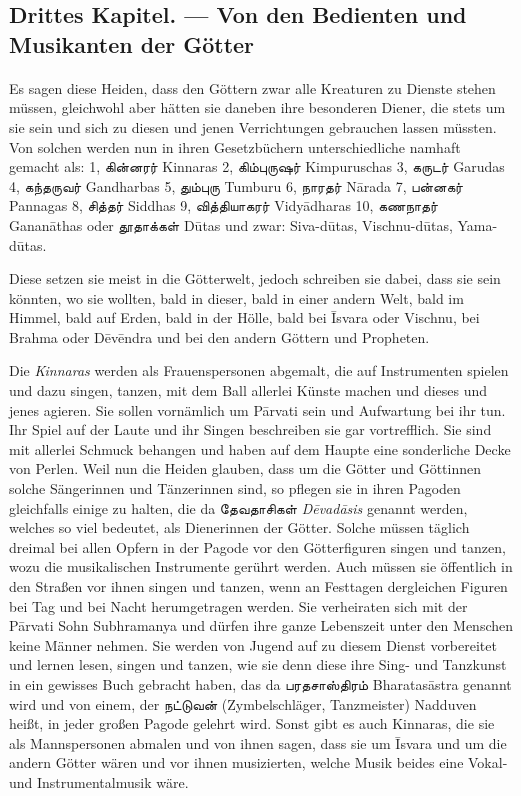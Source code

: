 \documentclass{article}
\newcommand{\TamilText}[1]{\texttamil{#1}}
\newcommand{\tam}[1]{\TamilText{#1}}
\begin{document}
\subsection{Drittes Kapitel. — Von den Bedienten und Musikanten der Götter}
\paragraph{}
Es sagen diese Heiden, dass den Göttern zwar alle Kreaturen zu Dienste stehen müssen, gleichwohl aber hätten sie daneben ihre besonderen Diener, die stets um sie sein und sich zu diesen und jenen Verrichtungen gebrauchen lassen müssten. Von solchen werden nun in ihren Gesetzbüchern unterschiedliche namhaft gemacht als: 1, \tam{கின்னரர்} Kinnaras 2, \tam{கிம்புருஷர்} Kimpuruschas 3, \tam{கருடர்} Garudas 4, \tam{கந்தருவர்} Gandharbas 5, \tam{தும்புரு} Tumburu 6, \tam{நாரதர்} N\={a}rada 7, \tam{பன்னகர்} Pannagas 8, \tam{சித்தர்} Siddhas 9, \tam{வித்தியாகரர்} Vidy\={a}dharas 10, \tam{கணநாதர்} Ganan\={a}thas oder \tam{தூதாக்கள்} D\={u}tas und zwar: Siva-d\={u}tas, Vischnu-d\={u}tas, Yama-d\={u}tas.

Diese setzen sie meist in die Götterwelt, jedoch schreiben sie dabei, dass sie sein könnten, wo sie wollten, bald in dieser, bald in einer andern Welt, bald im Himmel, bald auf Erden, bald in der Hölle, bald bei \={I}svara oder Vischnu, bei Brahma oder D\={e}v\={e}ndra und bei den andern Göttern und Propheten.

Die \emph{Kinnaras} werden als Frauenspersonen abgemalt, die auf Instrumenten spielen und dazu singen, tanzen, mit dem Ball allerlei Künste machen und dieses und jenes agieren. Sie sollen vornämlich um P\={a}rvati sein und Aufwartung bei ihr tun. Ihr Spiel auf der Laute und ihr Singen beschreiben sie gar vortrefflich. Sie sind mit allerlei Schmuck behangen und haben auf dem Haupte eine sonderliche Decke von Perlen. Weil nun die Heiden glauben, dass um die Götter und Göttinnen solche Sängerinnen und Tänzerinnen sind, so pflegen sie in ihren Pagoden gleichfalls einige zu halten, die da \tam{தேவதாசிகள்} \emph{D\={e}vad\={a}sis} genannt werden, welches so viel bedeutet, als Dienerinnen der Götter. Solche müssen täglich dreimal bei allen Opfern in der Pagode vor den Götterfiguren singen und tanzen, wozu die musikalischen Instrumente gerührt werden. Auch müssen sie öffentlich in den Straßen vor ihnen singen und tanzen, wenn an Festtagen dergleichen Figuren bei Tag und bei Nacht herumgetragen werden. Sie verheiraten sich mit der P\={a}rvati Sohn Subhramanya und dürfen ihre ganze Lebenszeit unter den Menschen keine Männer nehmen. Sie werden von Jugend auf zu diesem Dienst vorbereitet und lernen lesen, singen und tanzen, wie sie denn diese ihre Sing- und Tanzkunst in ein gewisses Buch gebracht haben, das da \tam{பரதசாஸ்திரம்} Bharatas\={a}stra genannt wird und von einem, der \tam{நட்டுவன்} (Zymbelschläger, Tanzmeister) Nadduven heißt, in jeder großen Pagode gelehrt wird. Sonst gibt es auch Kinnaras, die sie als Mannspersonen abmalen und von ihnen sagen, dass sie um \={I}svara und um die andern Götter wären und vor ihnen musizierten, welche Musik beides eine Vokal- und Instrumentalmusik wäre.
\end{document}
